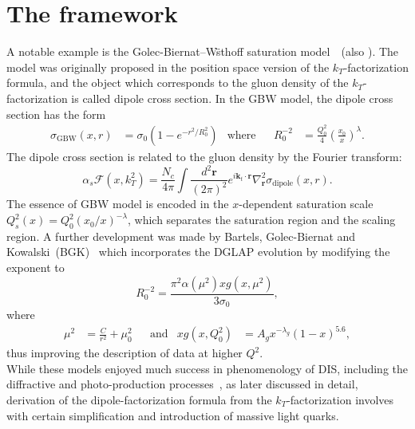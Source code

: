 \documentclass[11pt]{article}
\numberwithin{equation}{section}
\numberwithin{table}{section}
\numberwithin{figure}{section}
\newcommand{\comment}[1]{\texttt{\color{red}#1}}
\begin{document}
\section{The framework}

A notable example is the Golec-Biernat--W\"sthoff saturation model~\cite{Golec-Biernat:1998zce}~(also \cite{Kowalski:2003hm,McLerran:1993ni,Forshaw:1999uf,Iancu:2003ge}). The model was originally proposed in the position space version of the $k_T$-factorization formula, and the object which corresponds to the gluon density of the $k_T$-factorization is called dipole cross section.
In the GBW model, the dipole cross section has the form~\cite{Golec-Biernat:1998zce}
\begin{align}
\sigma_{\mathrm{GBW}}(x,r)&=\sigma_0\left(1-e^{-r^2/R^2_0}\right)&\mathrm{where}&
&R^{-2}_0&=\frac{Q_0^{2}}{4}\left(\frac{x_0}{x}\right)^\lambda.
\end{align}
The dipole cross section is related to the gluon density by the Fourier transform: 
\begin{equation}
\alpha_s\mathcal{F}(x,k_T^2)=\frac{N_c}{4\pi}\int\frac{d^2\mathbf{r}}{(2\pi)^2}e^{i\mathbf{k}_t\cdot \mathbf{r} }\nabla_{\mathbf{r}}^2\sigma_{\mathrm{dipole}}(x,r).
\label{eq:dipole-gluon}
\end{equation}
The essence of GBW model is encoded in the $x$-dependent saturation scale $Q_s^2(x)=Q^2_0(x_0/x)^{-\lambda}$, which separates the saturation region and the scaling region.
A further development was made by Bartels, Golec-Biernat and Kowalski~(BGK)~\cite{Bartels:2002cj} which incorporates the DGLAP evolution by modifying the exponent to 
\begin{equation}
R_0^{-2}=\frac{\pi^2\alpha(\mu^2)xg(x,\mu^2)}{3\sigma_0},
\end{equation}
where
\begin{align}
\mu^2&=\frac{C}{r^2}+\mu_0^2 & &\mathrm{and} & xg(x,Q^2_0)&=A_g x^{-\lambda_g}(1-x)^{5.6},
\end{align}
thus improving the description of data at higher $Q^2$.\\
While these models enjoyed much success in phenomenology of DIS, including the diffractive and photo-production processes~\cite{Golec-Biernat:1998zce,Golec-Biernat:1999qor}, as later discussed in detail, derivation of the dipole-factorization formula from the $k_T$-factorization involves with certain simplification and introduction of massive light quarks. 
\end{document}
